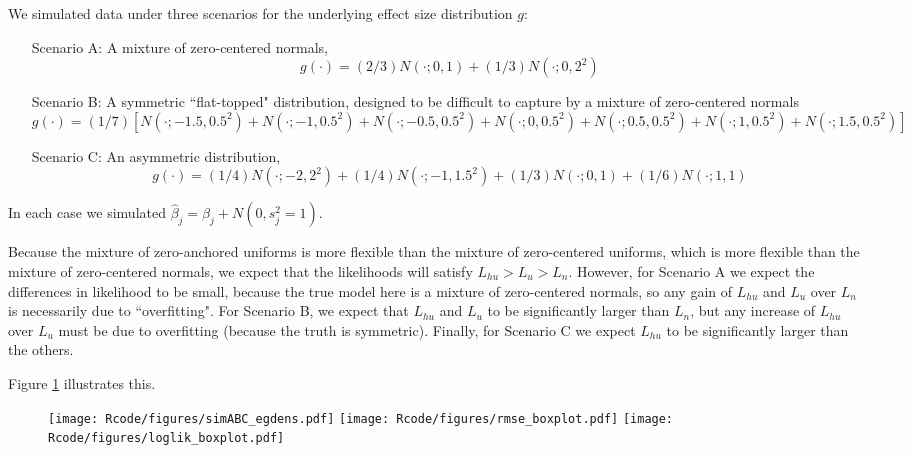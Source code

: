 \documentclass[11pt]{article}
\def\bhat{\hat{\beta}}
\begin{document}
We simulated data under three scenarios for the underlying effect size distribution $g$:
\begin{enumerate}
\item[Scenario A:]
A mixture of zero-centered normals,
\begin{equation}
g(\cdot) =  (2/3) N(\cdot; 0,1) + (1/3) N(\cdot; 0, 2^2)
\end{equation}
\item[Scenario B:]
A symmetric ``flat-topped" distribution, designed to be difficult to capture by a mixture of zero-centered normals 
\begin{equation}
g(\cdot) = (1/7) [N(\cdot; -1.5, 0.5^2) + N(\cdot; -1, 0.5^2) + N(\cdot; -0.5, 0.5^2) + N(\cdot; 0, 0.5^2) + N(\cdot; 0.5, 0.5^2) + N(\cdot; 1, 0.5^2) + N(\cdot; 1.5, 0.5^2)]
\end{equation}
\item[Scenario C:]
An asymmetric distribution, 
\begin{equation}
g(\cdot) = (1/4) N(\cdot; -2 ,2^2) + (1/4) N(\cdot; -1 ,1.5^2) + (1/3) N(\cdot; 0 ,1) + (1/6) N(\cdot; 1,1) 
\end{equation}
\end{enumerate}
In each case we simulated $\bhat_j  = \beta_j + N(0,s^2_j=1)$.

Because the mixture of zero-anchored uniforms is more flexible than the mixture of zero-centered uniforms, which is more flexible
than the mixture of zero-centered normals, we expect that the likelihoods will satisfy $L_{hu} > L_u > L_n$. However, for Scenario A we expect the differences in
likelihood to be small, because the true model here is a mixture of zero-centered normals, so any gain of $L_{hu}$ and $L_u$ over $L_n$ is necessarily due to ``overfitting".
For Scenario B, we expect that $L_{hu}$ and $L_{u}$ to be significantly larger than $L_n$, but any 
increase of $L_{hu}$ over $L_u$ must be due to overfitting (because the truth is symmetric). Finally, for Scenario C we
expect $L_{hu}$ to be significantly larger than the others.

Figure \ref{fig:rmse_loglik_boxplot} illustrates this.


\begin{figure}[!ht] \label{fig:rmse_loglik_boxplot}
\begin{center}
\texttt{[image: Rcode/figures/simABC\_egdens.pdf]}
\texttt{[image: Rcode/figures/rmse\_boxplot.pdf]}
\texttt{[image: Rcode/figures/loglik\_boxplot.pdf]}
\end{center}
\caption{}
\end{figure}
\end{document}
